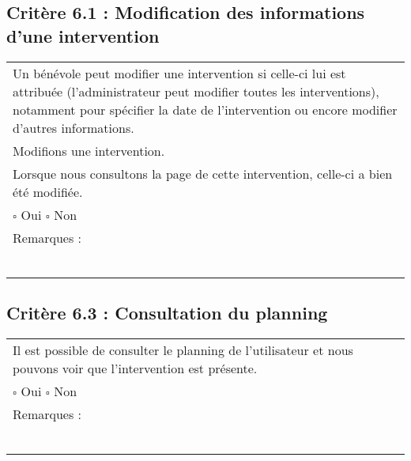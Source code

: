 	\subsection*{Critère 6.1 : Modification des informations d'une intervention }
  		\begin{center}
    	 		\begin{tabular}[h]{|p{}|}
			\hline
				Un bénévole peut modifier une intervention si celle-ci lui est attribuée (l'administrateur peut modifier toutes les interventions), notamment pour spécifier la date de l'intervention ou encore modifier d'autres informations. \\
				Modifions une intervention. \\
				Lorsque nous consultons la page de cette intervention, celle-ci a bien été modifiée. \\
				
				$\square$ Oui  \hfill \hfill $\square$ Non \\\hline Remarques : \\ ~\\
			 \\\hline
     		\end{tabular}
  		\end{center}	
  		
  	\subsection*{Critère 6.3 : Consultation du planning}
  		\begin{center}
    	 		\begin{tabular}[h]{|p{}|}
			\hline
				Il est possible de consulter le planning de l'utilisateur et nous pouvons voir que l'intervention est présente. \\
				
				$\square$ Oui  \hfill \hfill $\square$ Non \\\hline Remarques : \\ ~\\
			 \\\hline
     		\end{tabular}
  		\end{center}	